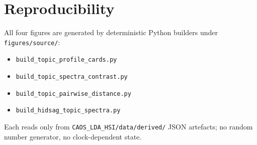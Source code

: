 \documentclass[11pt,a4paper]{article}
\begin{document}
\section{Reproducibility}

All four figures are generated by deterministic Python builders
under \texttt{figures/source/}:

\begin{itemize}
\item \texttt{build\_topic\_profile\_cards.py}
\item \texttt{build\_topic\_spectra\_contrast.py}
\item \texttt{build\_topic\_pairwise\_distance.py}
\item \texttt{build\_hidsag\_topic\_spectra.py}
\end{itemize}

Each reads only from \texttt{CAOS\_LDA\_HSI/data/derived/} JSON
artefacts; no random number generator, no clock-dependent state.



\end{document}

